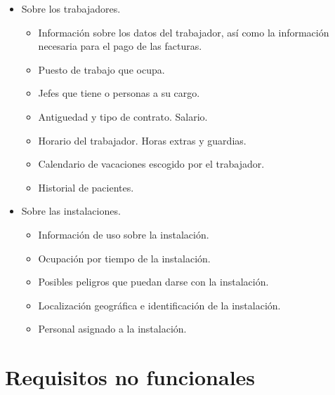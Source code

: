 \documentclass[11pt]{article}
\begin{document}
\begin{itemize}
\item Sobre los trabajadores.
\begin{itemize}
\item Información sobre los datos del trabajador, así como la información necesaria para el pago de las facturas.
\item Puesto de trabajo que ocupa.
\item Jefes que tiene o personas a su cargo.
\item Antiguedad y tipo de contrato. Salario.
\item Horario del trabajador. Horas extras y guardias.
\item Calendario de vacaciones escogido por el trabajador.
\item Historial de pacientes.
\end{itemize}

\item Sobre las instalaciones.
\begin{itemize}
\item Información de uso sobre la instalación.
\item Ocupación por tiempo de la instalación.
\item Posibles peligros que puedan darse con la instalación.
\item Localización geográfica e identificación de la instalación.
\item Personal asignado a la instalación.
\end{itemize}
\end{itemize}

\section{Requisitos no funcionales}
\label{sec:orgfe90b2e}
\end{document}
